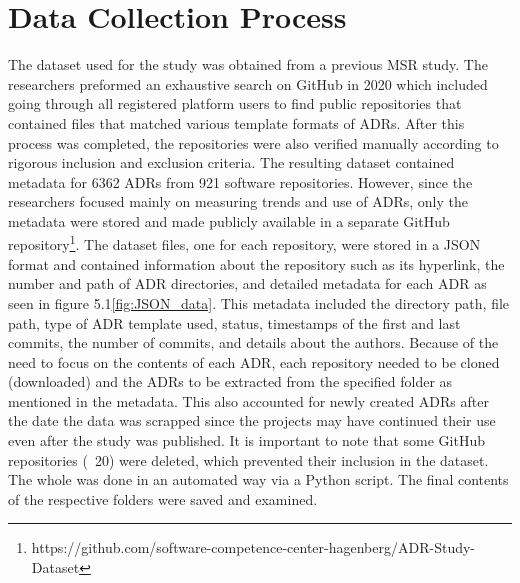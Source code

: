\section{Data Collection Process}
    The dataset used for the study was obtained from a previous MSR study\cite{Github_study_ADRs}. The researchers preformed an exhaustive search on GitHub in 2020 which included going through all registered platform users to find public repositories that contained files that matched various template formats of ADRs. After this process was completed, the repositories were also verified manually according to rigorous inclusion and exclusion criteria. The resulting dataset contained metadata for 6362 ADRs from 921 software repositories. However, since the researchers focused mainly on measuring trends and use of ADRs, only the metadata were stored and made publicly available in a separate GitHub repository\footnote{https://github.com/software-competence-center-hagenberg/ADR-Study-Dataset}. The dataset files, one for each repository, were stored in a JSON format and contained information about the repository such as its hyperlink, the number and path of ADR directories, and detailed metadata for each ADR as seen in figure 5.1\ref{fig:JSON_data}. This metadata included the directory path, file path, type of ADR template used, status, timestamps of the first and last commits, the number of commits, and details about the authors. Because of the need to focus on the contents of each ADR, each repository needed to be cloned (downloaded) and the ADRs to be extracted from the specified folder as mentioned in the metadata. This also accounted for newly created ADRs after the date the data was scrapped since the projects may have continued their use even after the study was published. It is important to note that some GitHub repositories (~20) were deleted, which prevented their inclusion in the dataset. The whole was done in an automated way via a Python script. The final contents of the respective folders were saved and examined.

